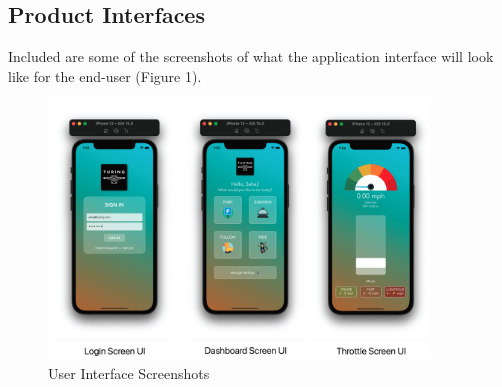 \subsection{Product Interfaces}
Included are some of the screenshots of what the application interface will look like for the end-user (Figure 1). 
\begin{figure}
    \centering
    \includegraphics[width=0.9\textwidth]{images/UI.png} %
    \caption{User Interface Screenshots}
\end{figure}

